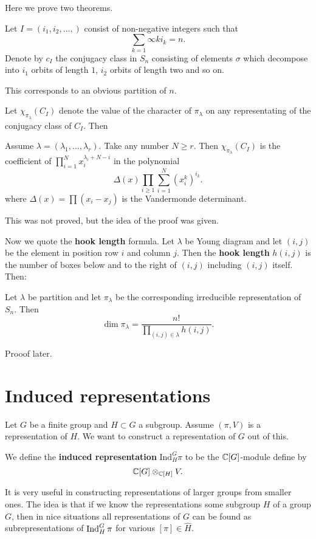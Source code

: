 \documentclass[11pt, english]{article}
\begin{document}
Here we prove two theorems. 

Let $I=(i_1,i_2,\ldots,)$ consist of non-negative integers such that
$$
\sum_{k=1}\infty ki_k=n.
$$
Denote by $c_I$ the conjugacy class in $S_n$ consisting of elements $\sigma$ which decompose into $i_1$ orbits of length $1$, $i_2$ orbits of length two and so on. 

This corresponds to an obvious partition of $n$.

Let $\chi_{\pi_\lambda}(C_I)$ denote the value of the character of $\pi_\lambda$ on any representating of the conjugacy class of $C_I$. Then
\begin{thm}
  
Assume $\lambda=(\lambda_1,\ldots,\lambda_r)$. Take any number $N \geq r$. Then $\chi_{\pi_\lambda}(C_I)$ is the coefficient of $\prod_{i=1}^N x_i^{\lambda_i+N-i}$ in the polynomial
$$
\Delta(x) \prod_{i \geq 1} \sum_{i=1}^N (x_i^k)^{i_k}.
$$
where $\Delta(x) = \prod (x_i-x_j)$ is the Vandermonde determinant.
\end{thm}

This was not proved, but the idea of the proof was given.

Now we quote the \textbf{hook length} formula. Let $\lambda$ be Young diagram and let $(i,j)$ be the element in position row $i$ and column $j$. Then the \textbf{hook length} $h(i,j)$ is the number of boxes below and to the right of $(i,j)$ including $(i,j)$ itself. Then:

\begin{thm}
  Let $\lambda$ be partition and let $\pi_\lambda$ be the corresponding irreducible representation of $S_n$. Then 
$$
\dim \pi_\lambda = \frac{n!}{\prod_{(i,j) \in \lambda} h(i,j)}.
$$
\end{thm}

Prooof later.

\newpage
\section{Induced representations}

Let $G$ be a finite group and $H \subset G$ a subgroup. Assume $(\pi,V)$ is a representation of $H$. We want to construct a representation of $G$ out of this.

We define the \textbf{induced representation} $\mathrm{Ind}_H^G \pi$ to be the $\mathbb{C}[G]$-module define by
$$
\mathbb{C}[G] \otimes_{\mathbb{C}[H]} V.
$$

It is very useful in constructing representations of larger groups from smaller ones. The idea is that if we know the representations some subgroup $H$ of a group $G$, then in nice situations all representations of $G$ can be found as subrepresentations of $\operatorname{Ind}_H^G \pi$ for various $[\pi] \in \hat H$.
\end{document}
